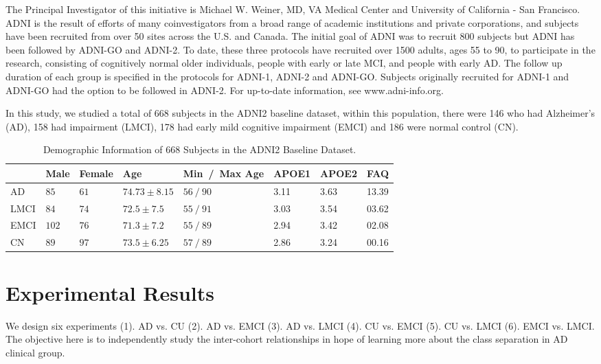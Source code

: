 \documentclass[authoryear,preprint,revi	ew,12pt]{elsarticle}
\newcommand{\Alz} {{Alzheimer\textquoteright s} }
\begin{document}
The Principal Investigator of this initiative is Michael W. Weiner, MD, VA Medical Center and University of California - San Francisco. ADNI is the result of efforts of many coinvestigators from a broad range of academic institutions and private corporations, and subjects have been recruited from over 50 sites across the U.S. and Canada. The initial goal of ADNI was to recruit 800 subjects but ADNI has been followed by ADNI-GO and ADNI-2. To date, these three protocols have recruited over 1500 adults, ages 55 to 90, to participate in the research, consisting of cognitively normal older individuals, people with early or late MCI, and people with early AD. The follow up duration of each group is specified in the protocols for ADNI-1, ADNI-2 and ADNI-GO. Subjects originally recruited for ADNI-1 and ADNI-GO had the option to be followed in ADNI-2. For up-to-date information, see www.adni-info.org.

In this study, we studied a total of 668 subjects in the ADNI2 baseline dataset, within this population, there were 146 who had \Alz (AD), 158 had impairment (LMCI), 178 had early mild cognitive impairment (EMCI) and 186 were normal control (CN).  

\begin{table}[t]
	\begin{center}
		\caption{Demographic Information of $668$ Subjects in the ADNI2 Baseline Dataset.}\label{tab:demographic}
		\begin{tabular}{|P{1.5cm}|P{1cm}P{1cm}P{2.25cm}P{3cm}P{1.25cm}P{1.25cm}P{1.25cm}|}
			\hline
			& Male & Female & Age & Min~/~Max Age & APOE1 & APOE2 & FAQ \\
			\hline\hline
			AD 		& $85$ 	& $61$ & $74.73 \pm 8.15$ 	& $56~/~90$ &	3.11 & 3.63 & 13.39\\
			LMCI 	& $84$ 	& $74$ & $72.5 	\pm 7.5$ 	& $55~/~91$ &	3.03 & 3.54 & 03.62\\
			EMCI 	& $102$ & $76$ & $ 71.3 \pm 7.2 $	& $55~/~89$ &	2.94 & 3.42 & 02.08\\
			CN 		& $89$ 	& $97$ & $ 73.5 \pm 6.25 $ 	& $57~/~89$ &	2.86 & 3.24 & 00.16\\
			\hline
		\end{tabular}
	\end{center}
\end{table}

\section{Experimental Results}
\label{sec:results}
We design six experiments (1). AD vs. CU (2). AD vs. EMCI (3). AD vs. LMCI (4). CU vs. EMCI (5). CU vs. LMCI (6). EMCI vs. LMCI. The objective here is to independently study the inter-cohort relationships in hope of learning more about the class separation in AD clinical group.
\end{document}
